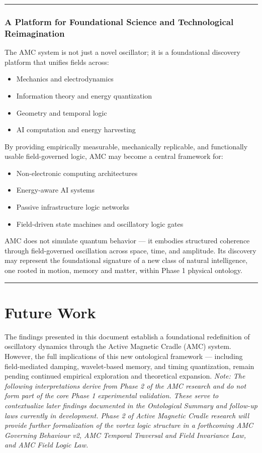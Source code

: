 \documentclass[10pt,aps,pre,onecolumn,superscriptaddress,notitlepage]{revtex4-2}
\begin{document}
\vspace{1em}
\hrule
\vspace{1em}


\subsubsection{A Platform for Foundational Science and Technological Reimagination
}
The AMC system is not just a novel oscillator; it is a foundational discovery platform that unifies fields across:
\begin{itemize}
    \item Mechanics and electrodynamics
    \item Information theory and energy quantization
    \item Geometry and temporal logic
    \item AI computation and energy harvesting
\end{itemize}

By providing empirically measurable, mechanically replicable, and functionally usable field-governed logic, AMC may become a central framework for:

\begin{itemize}
    \item Non-electronic computing architectures
    \item Energy-aware AI systems
    \item Passive infrastructure logic networks
    \item Field-driven state machines and oscillatory logic gates
\end{itemize}
AMC does not simulate quantum behavior — it embodies structured coherence through field-governed oscillation across space, time, and amplitude. Its discovery may represent the foundational signature of a new class of natural intelligence, one rooted in motion, memory and matter, within Phase 1 physical ontology. 

\vspace{1em}
\hrule
\vspace{1em}

\section{Future Work}
\label{sec:futurework}
The findings presented in this document establish a foundational redefinition of oscillatory dynamics through the Active Magnetic Cradle (AMC) system. However, the full implications of this new ontological framework — including field-mediated damping, wavelet-based memory, and timing quantization, remain pending continued empirical exploration and theoretical expansion.
\textit{Note: The following interpretations derive from Phase 2 of the AMC research and do not form part of the core Phase 1 experimental validation. These serve to contextualize later findings documented in the Ontological Summary and follow-up laws currently in development. Phase 2 of Active Magnetic Cradle research will provide further formalization of the vortex logic structure in a forthcoming AMC Governing Behaviour v2, AMC Temporal Traversal and Field Invariance Law, and AMC Field Logic Law.}
\end{document}
